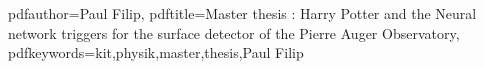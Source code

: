 \newcommand{\thesisentopic}{Harry Potter and the Neural network triggers for the surface detector of the Pierre Auger Observatory}

\newcommand{\thesisinstitute}{Institute for Astro Particle Physics}

\newcommand{\thesisauthor}{Paul Filip}
\newcommand{\thesisreviewerone}{Prof. Dr. Ralph Engel}
\newcommand{\thesisreviewertwo}{Prof. Dr. Guido Drexlin}

\newcommand{\thesistimestart}{01.04.2022}
\newcommand{\thesistimeend}{31.03.2022}
\newcommand{\thesistimehandin}{TBD}

\hypersetup
{
	pdfauthor={\thesisauthor},
	pdftitle={Master thesis : \thesisentopic},
	pdfkeywords={kit,physik,master,thesis,\thesisauthor}
}
